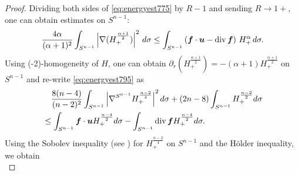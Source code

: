 \documentclass[12pt]{amsart}
\renewcommand{\div}{{\rm div \thinspace }}
\newcommand{\Bu}{{\boldsymbol{u}}}
\newcommand{\Bf}{{\boldsymbol{f}}}
\begin{document}
\begin{proof}
		Dividing both sides of \eqref{eq:energyest775} by $R-1$ and sending $R\to 1+$, one can obtain estimates on $S^{n-1}$:
		\begin{align}
			\label{eq:energyest795}
			\frac{4\alpha}{(\alpha+1)^2}
			\int _{S^{n-1}}
			\left|
			\nabla (H_+^{\frac{\alpha+1}{2}})
			\right|^2\, d\sigma 
			\leq
			\int _{ S^{n-1} }
			\left(
			\Bf\cdot \Bu - \div  \Bf
			\right) \, H_+^\alpha \, d\sigma.
		\end{align}
		Using (-2)-homogeneity of $H$, one can obtain $\partial_r (H_+^{\frac{\alpha+1}{2}})=-(\alpha+1) H_+^{\frac{\alpha+1}{2}}$ on $S^{n-1}$ and re-write \eqref{eq:energyest795} as
		\begin{equation}\label{eq:energyestofH}
			\begin{aligned}
				&\quad \frac{8(n-4)}{(n-2)^2} 
				\int_{S^{n-1}} 
				\left|
				\nabla^{S^{n-1}} H_+^{\frac{n-2}{4}}
				\right|^2 d \sigma 
				+ (2n-8) \int_{S^{n-1}}H_+^{\frac{n-2}{2}} d \sigma \\
				&\leq \int_{S^{n-1}} \Bf\cdot \Bu H_+^{\frac{n-4}{2}}d\sigma  - \int_{S^{n-1}} \div \Bf H_+^{\frac{n-4}{2}} d\sigma.
			\end{aligned}			
		\end{equation}
		Using the Sobolev inequality (see \cite{Aubin76}) for $H_+^{\frac{n-2}{4}}$ on $S^{n-1}$ and the H\"older inequality, we obtain 
		\begin{equation}\label{eq:firstestforH}

\end{equation}
\end{proof}
\end{document}

